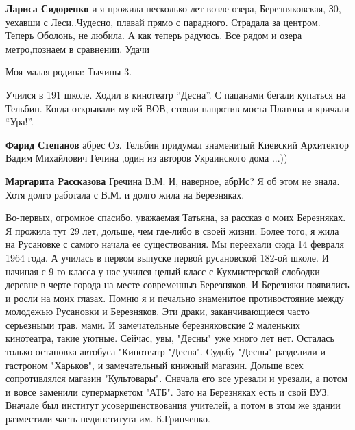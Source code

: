 \begin{itemize}
\begin{itemize} %
\textbf{Лариса Сидоренко} и я прожила несколько лет возле озера, Березняковская, З0, уехавши с Леси..Чудесно, плавай прямо с парадного. Страдала за центром. Теперь Оболонь, не любила. А как теперь радуюсь. Все рядом и озера метро,познаем в сравнении. Удачи
\end{itemize} %


Моя малая родина: Тычины 3.

Учился в 191 школе. Ходил в кинотеатр \enquote{Десна}. С пацанами бегали купаться на
Тельбин. Когда открывали музей ВОВ, стояли напротив моста Платона и кричали
\enquote{Ура!}.

\begin{itemize} %
\textbf{Фарид Степанов} абрес Оз. Тельбин придумал знаменитый Киевский Архитектор Вадим Михайлович Гечина ,один из авторов Украинского дома ...))

\textbf{Маргарита Рассказова} Гречина В.М. И, наверное, абрИс? Я об этом не знала. Хотя долго работала с В.М. и долго жила на Березняках.
\end{itemize} %


Во-первых, огромное спасибо, уважаемая Татьяна, за рассказ о моих Березняках. Я
прожила тут 29 лет, дольше, чем где-либо в своей жизни. Более того, я жила на
Русановке с самого начала ее существования. Мы переехали сюда 14 февраля 1964
года. А училась в первом выпуске первой русановской 182-ой школе. И начиная с
9-го класса у нас учился целый класс с Кухмистерской слободки - деревне в черте
города на месте современныз Березняков. И Березняки появились и росли на моих
глазах. Помню я и печально знаменитое противостояние между молодежью Русановки
и Березняков. Эти драки, заканчивающиеся часто серьезными трав. мами.  И
замечательные березняковские 2 маленьких кинотеатра, такие уютные. Сейчас, увы,
"Десны" уже много лет нет. Осталась только остановка автобуса "Кинотеатр
"Десна". Судьбу "Десны" разделили и гастроном "Харьков", и замечательный
книжный магазин. Дольше всех сопротивлялся магазин "Культовары". Сначала его
все урезали и урезали, а потом и вовсе заменили супермаркетом "АТБ". Зато на
Березняках есть и свой ВУЗ. Вначале был институт усовершенствования учителей, а
потом в этом же здании разместили часть пединститута им. Б.Гринченко.


\end{itemize}
